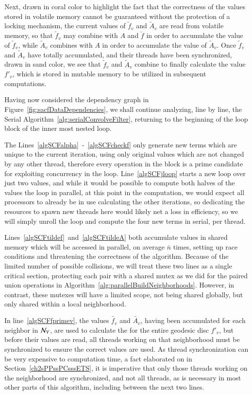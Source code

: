 Next, drawn in coral color to highlight the fact that the correctness of the values stored in volatile memory cannot be guaranteed without the protection of a locking mechanism, the current values of $\tilde{f}_v$ and $\tilde{A}_v$ are read from volatile memory, so that $\tilde{f}_v$ may combine with $A$ and $\check{f}$ in order to accumulate the value of $\tilde{f}_v$, while $\tilde{A}_v$ combines with $A$ in order to accumulate the value of $\tilde{A}_v$. Once $\tilde{f}_v$ and $\tilde{A}_v$ have totally accumulated, and their threads have been synchronized, drawn in sand color, we see that $\tilde{f}_v$ and $\tilde{A}_v$ combine to finally calculate the value $f'_v$, which is stored in mutable memory to be utilized in subsequent computations.

Having now considered the dependency graph in Figure~\ref{fig:sacfDataDependencies}, we shall continue analyzing, line by line, the Serial Algorithm~\ref{alg:serialConvolveFilter}, returning to the beginning of the loop block of the inner most nested loop.

The Lines~\ref{algSCFalpha}~-~\ref{algSCFcheckf} only generate new terms which are unique to the current iteration, using only original values which are not changed by any other thread, therefore every operation in the block is a prime candidate for exploiting concurrency in the loop. Line~\ref{algSCFjloop} starts a new loop over just two values, and while it would be possible to compute both halves of the values the loop in parallel, at this point in the computation, we would expect all processors to already be in use calculating the other iterations, so dedicating the resources to spawn new threads here would likely net a loss in efficiency, so we will simply unroll the loop and compute the four new terms in serial, per thread.

Lines~\ref{algSCFtildef}~and~\ref{algSCFtildeA} both accumulate values in shared memory which will be accessed in parallel, on average $\bar{n}$ times, setting up race conditions and threatening the correctness of the algorithm. Because of the limited number of possible collisions, we will treat these two lines as a single critical section, protecting each pair with a shared mutex as we did for the paired union operations in Algorithm~\ref{alg:parallelBuildNeighborhoods}. However, in contrast, these mutexes will have a limited scope, not being shared globally, but only shared within a local neighborhood.

In line~\ref{algSCFfprimev}, the values $\tilde{f_v}$ and $\tilde{A_v}$, having been accumulated for each neighbor in $\mathcal{N}_V$, are used to calculate the \wmfv{} for the entire geodesic disc $f'_v$, but before their values are read, all threads working on that neighborhood must be synchronized to ensure the correct values are used. As thread synchronization can be very expensive to computation time, a fact elaborated on in Section~\ref{ch2sPPssPCsssETS}, it is imperative that only those threads working on the neighborhood are synchronized, and not all threads, as is necessary in most other parts of this algorithm, including between the next two lines.

